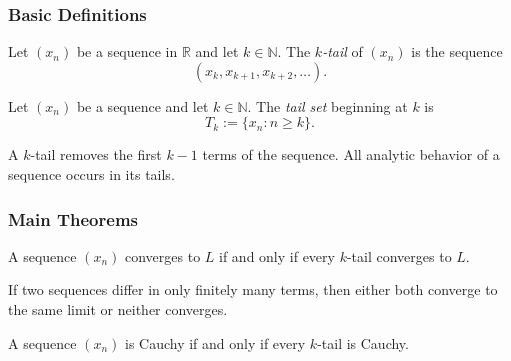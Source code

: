 \subsubsection{Basic Definitions}

\begin{tcolorbox}[colback=propbox, colframe=propborder, arc=2pt,
  left=6pt, right=6pt, top=4pt, bottom=4pt,
  title={\small\textbf{Definition (k-tail of a sequence)}},
  fonttitle=\small\bfseries]
Let $(x_n)$ be a sequence in $\mathbb{R}$ and let $k\in\mathbb{N}$.
The \emph{$k$-tail} of $(x_n)$ is the sequence
\[
(x_{k}, x_{k+1}, x_{k+2}, \dots).
\]
\end{tcolorbox}

\begin{tcolorbox}[colback=propbox, colframe=propborder, arc=2pt,
  left=6pt, right=6pt, top=4pt, bottom=4pt,
  title={\small\textbf{Definition (Tail set)}},
  fonttitle=\small\bfseries]
Let $(x_n)$ be a sequence and let $k\in\mathbb{N}$.
The \emph{tail set} beginning at $k$ is
\[
T_k := \{x_n : n \ge k\}.
\]
\end{tcolorbox}

\begin{remark}
A $k$-tail removes the first $k-1$ terms of the sequence.
All analytic behavior of a sequence occurs in its tails.
\end{remark}

\subsubsection{Main Theorems}

\begin{theorem}
A sequence $(x_n)$ converges to $L$ if and only if
every $k$-tail converges to $L$.
\end{theorem}



\begin{theorem}
If two sequences differ in only finitely many terms,
then either both converge to the same limit or neither converges.
\end{theorem}



\begin{theorem}
A sequence $(x_n)$ is Cauchy if and only if
every $k$-tail is Cauchy.
\end{theorem}



